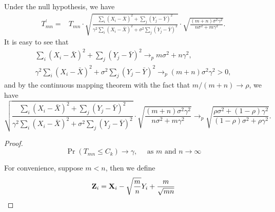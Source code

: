 Under the null hypothesis, we have
\begin{equation*}
	\begin{aligned}
		T_{mn}^{\prime}= & T_{mn}\cdot\sqrt{\frac{\sum_{i}\left(X_i-\bar{X}\right)^2+\sum_{j}\left(Y_j-\bar{Y}\right)^2}{\gamma^{2}\sum_{i}\left(X_i-\bar{X}\right)^2+\sigma^{2}\sum_{j}\left(Y_j-\bar{Y}\right)^2}}\cdot\sqrt{\frac{(m+n)\sigma^{2}\gamma^{2}}{n\sigma^{2}+m\gamma^{2}}}.
	\end{aligned}
\end{equation*}
It is easy to see that
\begin{gather*}
	\sum_{i}\left(X_i-\bar{X}\right)^2+\sum_{j}\left(Y_j-\bar{Y}\right)^2\rightarrow_{p} m\sigma^{2}+n\gamma^{2},\\
	\gamma^{2}\sum_{i}\left(X_i-\bar{X}\right)^2+\sigma^{2}\sum_{j}\left(Y_j-\bar{Y}\right)^2\rightarrow_{p} (m+n)\sigma^{2}\gamma^{2}>0,
\end{gather*}
and by the continuous mapping theorem with the fact that $m/(m+n)\rightarrow\rho$, we have
\begin{equation*}
	\sqrt{\frac{\sum_{i}\left(X_i-\bar{X}\right)^2+\sum_{j}\left(Y_j-\bar{Y}\right)^2}{\gamma^{2}\sum_{i}\left(X_i-\bar{X}\right)^2+\sigma^{2}\sum_{j}\left(Y_j-\bar{Y}\right)^2}}\cdot\sqrt{\frac{(m+n)\sigma^{2}\gamma^{2}}{n\sigma^{2}+m\gamma^{2}}}\rightarrow_{p}\sqrt{\frac{\rho\sigma^{2}+(1-\rho)\gamma^{2}}{(1-\rho)\sigma^{2}+\rho\gamma^{2}}}.
\end{equation*}

\begin{proof}
	\begin{equation*}
		\Pr\left(T_{mn}\leq C_{k}\right)\rightarrow\gamma,\quad\text{ as }m\text{ and }n\rightarrow\infty
	\end{equation*}

	For convenience, suppose $m<n$, then we define
	\begin{equation*}
		{\bf Z}_{i}={\bf X}_{i}-\sqrt{\frac{m}{n}}Y_{i}+\frac{m}{\sqrt{mn}}
	\end{equation*}
\end{proof}
